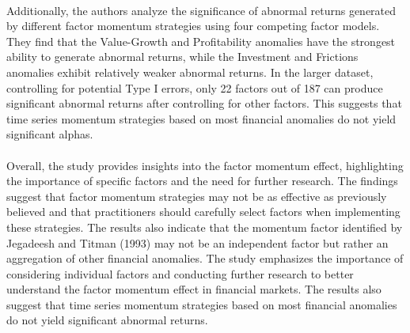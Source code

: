 \documentclass{article}
\begin{document}
\\
Additionally, the authors analyze the significance of abnormal returns generated by different factor momentum strategies using four competing factor models. They find that the Value-Growth and Profitability anomalies have the strongest ability to generate abnormal returns, while the Investment and Frictions anomalies exhibit relatively weaker abnormal returns. In the larger dataset, controlling for potential Type I errors, only 22 factors out of 187 can produce significant abnormal returns after controlling for other factors. This suggests that time series momentum strategies based on most financial anomalies do not yield significant alphas. \\
\\
Overall, the study provides insights into the factor momentum effect, highlighting the importance of specific factors and the need for further research. The findings suggest that factor momentum strategies may not be as effective as previously believed and that practitioners should carefully select factors when implementing these strategies. The results also indicate that the momentum factor identified by Jegadeesh and Titman (1993) may not be an independent factor but rather an aggregation of other financial anomalies. The study emphasizes the importance of considering individual factors and conducting further research to better understand the factor momentum effect in financial markets. The results also suggest that time series momentum strategies based on most financial anomalies do not yield significant abnormal returns. 
\end{document}
